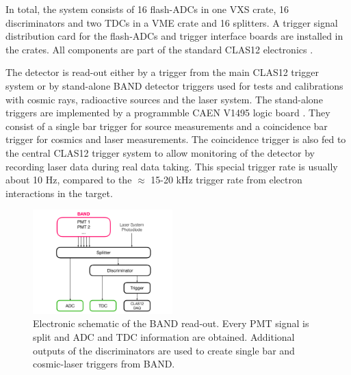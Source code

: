 \documentclass[3p,final,twocolumn]{elsarticle}
\begin{document}
In total, the system consists of 16 flash-ADCs in one VXS crate, 16
discriminators and two TDCs in a VME crate and 16 splitters.
A trigger signal distribution card for the flash-ADCs and
trigger interface boards are installed in the crates. All components
are part of the standard CLAS12 electronics \cite{clas12-daq, clas12-trigger}.

The detector is read-out either by a trigger from the main CLAS12
trigger system \cite{clas12-trigger} or by stand-alone BAND detector
triggers used for tests and calibrations with cosmic rays, radioactive
sources and the laser system. The stand-alone triggers are implemented
by a programmble CAEN V1495 logic board \cite{caen-logicboard}. They
consist of a single bar trigger for source measurements and a
coincidence bar trigger for cosmics and laser measurements. The
coincidence trigger is also fed to the central CLAS12 trigger system
to allow monitoring of the detector by recording laser data during
real data taking. This special trigger rate is usually about 10
\si{\hertz}, compared to the $\approx$ 15-20 \si{\kilo\hertz} trigger
rate from electron interactions in the target.

\begin{figure}[tb]
	\centering
	\includegraphics[width=0.48\textwidth]{electronics-diag.pdf}
	\caption{Electronic schematic of the BAND read-out. Every PMT signal is split and ADC and TDC information are obtained. Additional outputs of the discriminators are used to create single bar and cosmic-laser triggers from BAND.}
	\label{fig:electronic-diag}
\end{figure}


\end{document}
